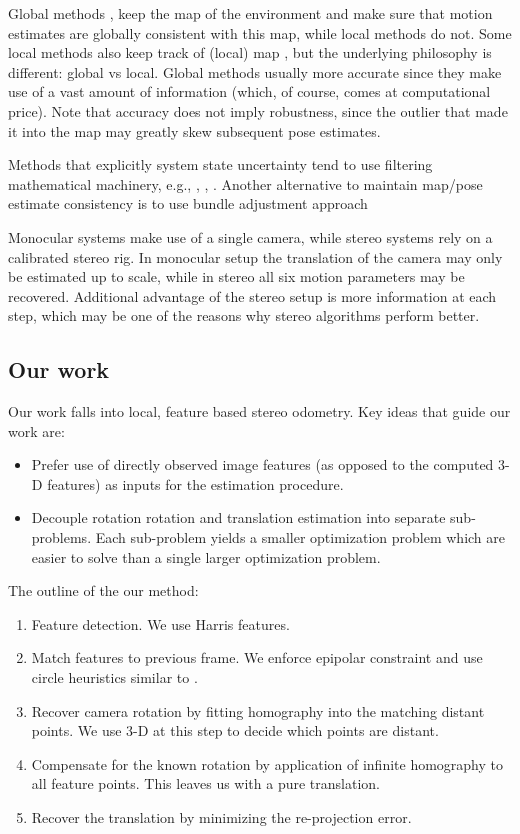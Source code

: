 \documentclass[runningheads]{llncs}
\begin{document}
Global methods \cite{Klein2007}, \cite{Newcombe2011} keep the map of
the environment and make sure that motion estimates are globally
consistent with this map, while local methods do not.  Some local
methods \cite{Badino2013} also keep track of (local) map , but the
underlying philosophy is different: global vs local.  Global methods
usually more accurate since they make use of a vast amount of
information (which, of course, comes at computational price).  Note
that accuracy does not imply robustness, since the outlier that made
it into the map may greatly skew subsequent pose estimates.

Methods that explicitly system state uncertainty tend to use filtering
mathematical machinery, e.g., \cite{Konolige2010}, \cite{Olson2003},
\cite{Kaess2008}.  Another alternative to maintain map/pose estimate
consistency is to use bundle adjustment approach \cite{Triggs2000}

Monocular systems \cite{Song} make use of a single camera, while
stereo systems \cite{Geiger2011} rely on a calibrated stereo rig. In
monocular setup the translation of the camera may only be estimated up
to scale, while in stereo all six motion parameters may be
recovered. Additional advantage of the stereo setup is more
information at each step, which may be one of the reasons why stereo
algorithms perform better.

\subsection{Our work}

Our work falls into local, feature based stereo odometry. Key ideas
that guide our work are:
\begin{itemize}
\item Prefer use of directly observed image features (as opposed to
  the computed 3-D features) as inputs for the estimation procedure.
\item Decouple rotation rotation and translation estimation into
  separate sub-problems.  Each sub-problem yields a smaller
  optimization problem which are easier to solve than a single larger
  optimization problem.
\end{itemize}

The outline of the our method:
\begin{enumerate}
\item Feature detection.  We use Harris \cite{Harris1987} features.
\item Match features to previous frame. We enforce epipolar constraint
  and use circle heuristics similar to \cite{Geiger2011}.
\item Recover camera rotation by fitting homography into the matching
  distant points.  We use 3-D at this step to decide which points are
  distant.
\item Compensate for the known rotation by application of infinite
  homography to all feature points.  This leaves us with a pure
  translation.
\item Recover the translation by minimizing the re-projection error.
\end{enumerate}
\end{document}
